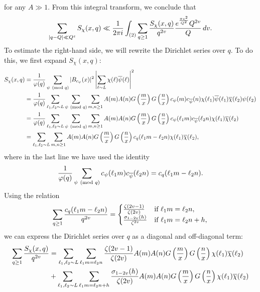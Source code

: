 \documentclass[12pt,reqno,oneside]{amsart}
\begin{document}
    for any $A \gg 1$. From this integral transform, we conclude that
    \[
      \sum_{|q-Q| \ll Q^{\varepsilon}}S_{\chi}(x,q) \ll \frac{1}{2\pi i}\int_{(2)}\sum_{q \ge 1}\frac{S_{\chi}(x,q)}{q^{2v}}\frac{e^{\frac{\pi v^{2}}{Q^{2}}}Q^{2v}}{Q}\,dv.
    \]
    To estimate the right-hand side, we will rewrite the Dirichlet series over $q$. To do this, we first expand $S_{\chi}(x,q)$:
    \begin{align*}
      S_{\chi}(x,q) &= \frac{1}{\varphi(q)}\sum_{\psi \ \left(\text{mod }q\right)}|B_{c_{\psi}}(x)|^{2}\left|\sum_{\ell \sim L}\chi(\ell)\overline{\psi}(\ell)\right|^{2} \\
      &= \frac{1}{\varphi(q)}\sum_{\ell_{1},\ell_{2} \sim L}\sum_{\psi \ \left(\text{mod }q\right)}\sum_{m,n \ge 1}A(m)A(n)G\left(\frac{m}{x}\right)G\left(\frac{n}{x}\right)c_{\psi}(m)c_{\overline{\psi}}(n)\chi(\ell_{1})\overline{\psi}(\ell_{1})\overline{\chi}(\ell_{2})\psi(\ell_{2}) \\
      &= \frac{1}{\varphi(q)}\sum_{\ell_{1},\ell_{2} \sim L}\sum_{\psi \ \left(\text{mod }q\right)}\sum_{m,n \ge 1}A(m)A(n)G\left(\frac{m}{x}\right)G\left(\frac{n}{x}\right)c_{\psi}(\ell_{1}m)c_{\overline{\psi}}(\ell_{2}n)\chi(\ell_{1})\overline{\chi}(\ell_{2}) \\
      &= \sum_{\ell_{1},\ell_{2} \sim L}\sum_{m,n \ge 1}A(m)A(n)G\left(\frac{m}{x}\right)G\left(\frac{n}{x}\right)c_{q}(\ell_{1}m-\ell_{2}n)\chi(\ell_{1})\overline{\chi}(\ell_{2}),
    \end{align*}
    where in the last line we have used the identity
    \[
      \frac{1}{\varphi(q)}\sum_{\psi \ \left(\text{mod }q\right)}c_{\psi}(\ell_{1}m)c_{\overline{\psi}}(\ell_{2}n) = c_{q}(\ell_{1}m-\ell_{2}n).
    \]
    Using the relation
    \[
      \sum_{q \ge 1}\frac{c_{q}(\ell_{1}m-\ell_{2}n)}{q^{2v}} = \begin{cases} \frac{\zeta(2v-1)}{\zeta(2v)} & \text{if $\ell_{1}m = \ell_{2}n$}, \\ \frac{\sigma_{1-2v}(h)}{\zeta^{2v}} & \text{if $\ell_{1}m = \ell_{2}n+h$}, \end{cases}
    \]
    we can express the Dirichlet series over $q$ as a diagonal and off-diagonal term:
    \begin{align*}
      \sum_{q \ge 1}\frac{S_{\chi}(x,q)}{q^{2v}} &= \sum_{\ell_{1},\ell_{2} \sim L}\sum_{\ell_{1}m = \ell_{2}n}\frac{\zeta(2v-1)}{\zeta(2v)}A(m)A(n)G\left(\frac{m}{x}\right)G\left(\frac{n}{x}\right)\chi(\ell_{1})\overline{\chi}(\ell_{2}) \\
      &+\sum_{\ell_{1},\ell_{2} \sim L}\sum_{\ell_{1}m = \ell_{2}n+h}\frac{\sigma_{1-2v}(h)}{\zeta(2v)}A(m)A(n)G\left(\frac{m}{x}\right)G\left(\frac{n}{x}\right)\chi(\ell_{1})\overline{\chi}(\ell_{2})
    \end{align*}
\end{document}

